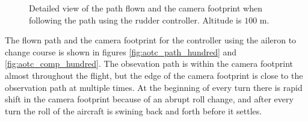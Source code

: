 \begin{figure}[]
    \centering
    \caption{Detailed view of the path flown and the camera footprint when following the path using the rudder controller. Altitude is $100$ m.}
	\label{fig:ratc_comp_hundred}
\end{figure}

The flown path and the camera footprint for the controller using the aileron to change course is shown in figures \ref{fig:aotc_path_hundred} and \ref{fig:aotc_comp_hundred}. The obsevation path is within the camera footprint almost throughout the flight, but the edge of the camera footprint is close to the observation path at multiple times. At the beginning of every turn there is rapid shift in the camera footprint because of an abrupt roll change, and after every turn the roll of the aircraft is swining back and forth before it settles.

